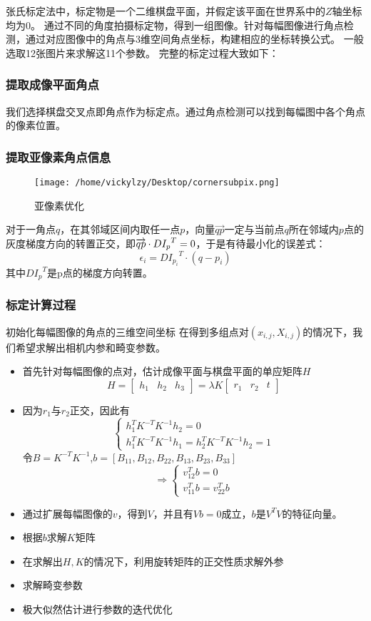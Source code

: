 \documentclass[10pt,a4paper]{article}
\begin{document}
\begin{CJK*}{UTF8}{gbsn}
张氏标定法中，标定物是一个二维棋盘平面，并假定该平面在世界系中的$Z$轴坐标均为0。
通过不同的角度拍摄标定物，得到一组图像。针对每幅图像进行角点检测，通过对应图像中的角点与3维空间角点坐标，构建相应的坐标转换公式。
一般选取12张图片来求解这11个参数。
完整的标定过程大致如下：
\subsubsection{提取成像平面角点}
我们选择棋盘交叉点即角点作为标定点。通过角点检测可以找到每幅图中各个角点的像素位置。
\subsubsection{提取亚像素角点信息}
\begin{figure}[htbp]
    \centering
    \texttt{[image: /home/vickylzy/Desktop/cornersubpix.png]}
    \caption{亚像素优化}
\end{figure}
对于一角点$q$，在其邻域区间内取任一点$p$，向量$\overrightarrow {qp} $一定与当前点$q$所在邻域内$p$点的灰度梯度方向的转置正交，即$\overrightarrow {qp} {\rm{ }} \cdot {\rm{ }}D{I_p}^T = 0$，于是有待最小化的误差式：
$$
\epsilon _i = {DI_{p_i}}^T \cdot (q - p_i)
$$
其中${DI_p}^T$是p点的梯度方向转置。
\subsubsection{标定计算过程}
初始化每幅图像的角点的三维空间坐标
在得到多组点对$(x_{i,j},X_{i,j})$的情况下，我们希望求解出相机内参和畸变参数。

\begin{itemize}
    \item 首先针对每幅图像的点对，估计成像平面与棋盘平面的单应矩阵$H$
     $$
      H =\left[\begin{array}{ccc}h_1&h_2&h_3 \end{array}\right]= \lambda K \left[\begin{array}{ccc}r_1&r_2&t \end{array}\right]
     $$
    \item 因为$r_1$与$r_2$正交，因此有
    $$
    \left\{
    \begin{array}{l}h_1^TK^{-T}K^{-1}h_2 = 0 \\ h_1^TK^{-T}K^{-1}h_1 = h_2^TK^{-T}K^{-1}h_2 = 1\end{array}
    \right. 
    $$
    令$B=K^{-T}K^{-1}$,$b=[B_{11},B_{12},B_{22},B_{13},B_{23},B_{33}]$
    $$
    \Rightarrow 
    \left\{ \begin{array}{l}v_{12}^Tb = 0 \\ v_{11}^Tb = v_{22}^Tb \end{array}\right.
    $$
    \item 通过扩展每幅图像的$v$，得到$V$，并且有$Vb=0$成立，$b$是$V^T V$的特征向量。
    \item 根据$b$求解$K$矩阵
    \item 在求解出$H,K$的情况下，利用旋转矩阵的正交性质求解外参
    \item 求解畸变参数
    \item 极大似然估计进行参数的迭代优化
\end{itemize}

\end{CJK*}
\end{document}
